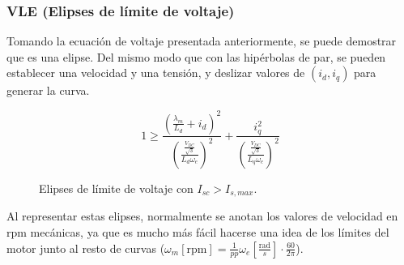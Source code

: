 \subsubsection{VLE (Elipses de límite de voltaje)}

Tomando la ecuación de voltaje presentada anteriormente, se puede demostrar que es una elipse. Del mismo modo que con las hipérbolas de par, se pueden establecer una velocidad y una tensión, y deslizar valores de \((i_d, i_q)\) para generar la curva.

\begin{equation}
1 \geq \frac{\left(\frac{\lambda_m}{L_d}+i_d\right)^2}{\left(\frac{\frac{V_{DC}}{\sqrt{3}}}{L_d\omega_e}\right)^2}+\frac{i_q^2}{\left(\frac{\frac{V_{DC}}{\sqrt{3}}}{L_q\omega_e}\right)^2}
\end{equation}




\begin{figure}[H]
  \centering
  \caption{Elipses de límite de voltaje con $I_{sc} > I_{s,max}$.}
\end{figure}


Al representar estas elipses, normalmente se anotan los valores de velocidad en rpm mecánicas, ya que es mucho más fácil hacerse una idea de los límites del motor junto al resto de curvas (\(\omega_m [\text{rpm}] = \frac{1}{pp} \omega_e \left[\frac{\text{rad}}{s}\right] \cdot \frac{60}{2\pi}\)).


